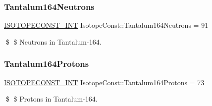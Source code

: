 \subsubsection{\texorpdfstring{Tantalum164\+Neutrons}{Tantalum164Neutrons}}
{\footnotesize\ttfamily \mbox{\hyperlink{group___isotope_const-_macros_ga5f18360b3e99483a35c32d789e62621c}{I\+S\+O\+T\+O\+P\+E\+C\+O\+N\+S\+T\+\_\+\+I\+NT}} Isotope\+Const\+::\+Tantalum164\+Neutrons = 91}

\$ \$ Neutrons in Tantalum-\/164. \mbox{\label{group___isotope_const-_tantalum-_ta164_gab9a4f1ac3034b336626e3701eca95ff7}} 
\subsubsection{\texorpdfstring{Tantalum164\+Protons}{Tantalum164Protons}}
{\footnotesize\ttfamily \mbox{\hyperlink{group___isotope_const-_macros_ga5f18360b3e99483a35c32d789e62621c}{I\+S\+O\+T\+O\+P\+E\+C\+O\+N\+S\+T\+\_\+\+I\+NT}} Isotope\+Const\+::\+Tantalum164\+Protons = 73}

\$ \$ Protons in Tantalum-\/164. 